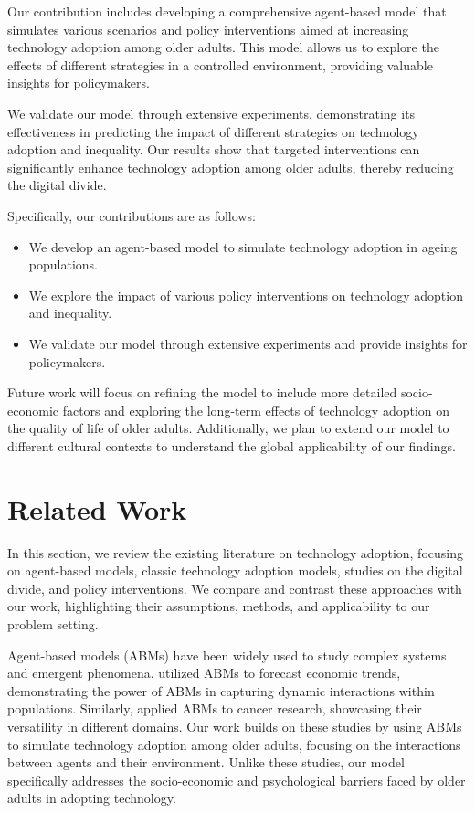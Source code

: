 \documentclass{article} %
\begin{document}
Our contribution includes developing a comprehensive agent-based model that simulates various scenarios and policy interventions aimed at increasing technology adoption among older adults. This model allows us to explore the effects of different strategies in a controlled environment, providing valuable insights for policymakers.

We validate our model through extensive experiments, demonstrating its effectiveness in predicting the impact of different strategies on technology adoption and inequality. Our results show that targeted interventions can significantly enhance technology adoption among older adults, thereby reducing the digital divide.

Specifically, our contributions are as follows:
\begin{itemize}
    \item We develop an agent-based model to simulate technology adoption in ageing populations.
    \item We explore the impact of various policy interventions on technology adoption and inequality.
    \item We validate our model through extensive experiments and provide insights for policymakers.
\end{itemize}

Future work will focus on refining the model to include more detailed socio-economic factors and exploring the long-term effects of technology adoption on the quality of life of older adults. Additionally, we plan to extend our model to different cultural contexts to understand the global applicability of our findings.

\section{Related Work}
\label{sec:related}

In this section, we review the existing literature on technology adoption, focusing on agent-based models, classic technology adoption models, studies on the digital divide, and policy interventions. We compare and contrast these approaches with our work, highlighting their assumptions, methods, and applicability to our problem setting.

Agent-based models (ABMs) have been widely used to study complex systems and emergent phenomena. \citet{poledna2023economic} utilized ABMs to forecast economic trends, demonstrating the power of ABMs in capturing dynamic interactions within populations. Similarly, \citet{west2023agent} applied ABMs to cancer research, showcasing their versatility in different domains. Our work builds on these studies by using ABMs to simulate technology adoption among older adults, focusing on the interactions between agents and their environment. Unlike these studies, our model specifically addresses the socio-economic and psychological barriers faced by older adults in adopting technology.
\end{document}
